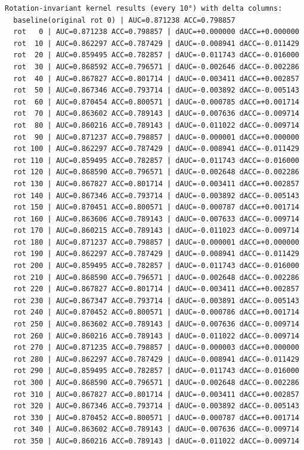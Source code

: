 \documentclass{article}
\begin{document}
\begin{verbatim}
Rotation-invariant kernel results (every 10°) with delta columns:
  baseline(original rot 0) | AUC=0.871238 ACC=0.798857
  rot   0 | AUC=0.871238 ACC=0.798857 | dAUC=+0.000000 dACC=+0.000000
  rot  10 | AUC=0.862297 ACC=0.787429 | dAUC=-0.008941 dACC=-0.011429
  rot  20 | AUC=0.859495 ACC=0.782857 | dAUC=-0.011743 dACC=-0.016000
  rot  30 | AUC=0.868592 ACC=0.796571 | dAUC=-0.002646 dACC=-0.002286
  rot  40 | AUC=0.867827 ACC=0.801714 | dAUC=-0.003411 dACC=+0.002857
  rot  50 | AUC=0.867346 ACC=0.793714 | dAUC=-0.003892 dACC=-0.005143
  rot  60 | AUC=0.870454 ACC=0.800571 | dAUC=-0.000785 dACC=+0.001714
  rot  70 | AUC=0.863602 ACC=0.789143 | dAUC=-0.007636 dACC=-0.009714
  rot  80 | AUC=0.860216 ACC=0.789143 | dAUC=-0.011022 dACC=-0.009714
  rot  90 | AUC=0.871237 ACC=0.798857 | dAUC=-0.000001 dACC=+0.000000
  rot 100 | AUC=0.862297 ACC=0.787429 | dAUC=-0.008941 dACC=-0.011429
  rot 110 | AUC=0.859495 ACC=0.782857 | dAUC=-0.011743 dACC=-0.016000
  rot 120 | AUC=0.868590 ACC=0.796571 | dAUC=-0.002648 dACC=-0.002286
  rot 130 | AUC=0.867827 ACC=0.801714 | dAUC=-0.003411 dACC=+0.002857
  rot 140 | AUC=0.867346 ACC=0.793714 | dAUC=-0.003892 dACC=-0.005143
  rot 150 | AUC=0.870451 ACC=0.800571 | dAUC=-0.000787 dACC=+0.001714
  rot 160 | AUC=0.863606 ACC=0.789143 | dAUC=-0.007633 dACC=-0.009714
  rot 170 | AUC=0.860215 ACC=0.789143 | dAUC=-0.011023 dACC=-0.009714
  rot 180 | AUC=0.871237 ACC=0.798857 | dAUC=-0.000001 dACC=+0.000000
  rot 190 | AUC=0.862297 ACC=0.787429 | dAUC=-0.008941 dACC=-0.011429
  rot 200 | AUC=0.859495 ACC=0.782857 | dAUC=-0.011743 dACC=-0.016000
  rot 210 | AUC=0.868590 ACC=0.796571 | dAUC=-0.002648 dACC=-0.002286
  rot 220 | AUC=0.867827 ACC=0.801714 | dAUC=-0.003411 dACC=+0.002857
  rot 230 | AUC=0.867347 ACC=0.793714 | dAUC=-0.003891 dACC=-0.005143
  rot 240 | AUC=0.870452 ACC=0.800571 | dAUC=-0.000786 dACC=+0.001714
  rot 250 | AUC=0.863602 ACC=0.789143 | dAUC=-0.007636 dACC=-0.009714
  rot 260 | AUC=0.860216 ACC=0.789143 | dAUC=-0.011022 dACC=-0.009714
  rot 270 | AUC=0.871235 ACC=0.798857 | dAUC=-0.000003 dACC=+0.000000
  rot 280 | AUC=0.862297 ACC=0.787429 | dAUC=-0.008941 dACC=-0.011429
  rot 290 | AUC=0.859495 ACC=0.782857 | dAUC=-0.011743 dACC=-0.016000
  rot 300 | AUC=0.868590 ACC=0.796571 | dAUC=-0.002648 dACC=-0.002286
  rot 310 | AUC=0.867827 ACC=0.801714 | dAUC=-0.003411 dACC=+0.002857
  rot 320 | AUC=0.867346 ACC=0.793714 | dAUC=-0.003892 dACC=-0.005143
  rot 330 | AUC=0.870452 ACC=0.800571 | dAUC=-0.000787 dACC=+0.001714
  rot 340 | AUC=0.863602 ACC=0.789143 | dAUC=-0.007636 dACC=-0.009714
  rot 350 | AUC=0.860216 ACC=0.789143 | dAUC=-0.011022 dACC=-0.009714
\end{verbatim}
\end{document}
